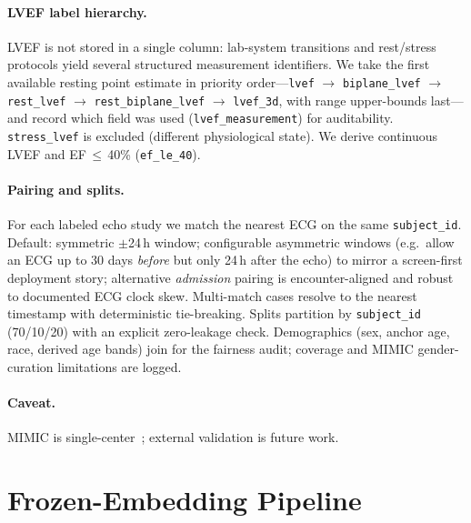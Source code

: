 \documentclass{article}
\begin{document}
\paragraph{LVEF label hierarchy.} LVEF is not stored in a single column: lab-system transitions
and rest/stress protocols yield several structured measurement identifiers. We take the first
available resting point estimate in priority order---\texttt{lvef} $\rightarrow$
\texttt{biplane\_lvef} $\rightarrow$ \texttt{rest\_lvef} $\rightarrow$ \texttt{rest\_biplane\_lvef}
$\rightarrow$ \texttt{lvef\_3d}, with range upper-bounds last---and record which field was used
(\texttt{lvef\_measurement}) for auditability. \texttt{stress\_lvef} is excluded (different
physiological state). We derive continuous LVEF and \mbox{EF\,$\leq$\,40\%} (\texttt{ef\_le\_40}).

\paragraph{Pairing and splits.} For each labeled echo study we match the nearest ECG on the same
\texttt{subject\_id}. Default: symmetric $\pm$24\,h window; configurable asymmetric windows
(e.g.\ allow an ECG up to 30 days \emph{before} but only 24\,h after the echo) to mirror a
screen-first deployment story; alternative \emph{admission} pairing is encounter-aligned and
robust to documented ECG clock skew. Multi-match cases resolve to the nearest timestamp with
deterministic tie-breaking. Splits partition by \texttt{subject\_id} (70/10/20) with an explicit
zero-leakage check. Demographics (sex, anchor age, race, derived age bands) join for the
fairness audit; coverage and MIMIC gender-curation limitations are logged.


\paragraph{Caveat.} MIMIC is single-center~\citep{johnson2023mimiciv}; external validation is
future work.

\section{Frozen-Embedding Pipeline}
\label{sec:method}

\end{document}
